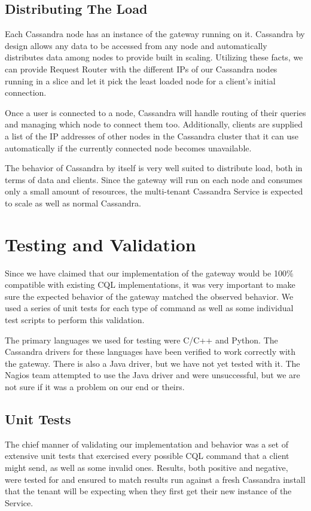 \documentclass[11pt,notitlepage]{report}
\begin{document}
\section*{Distributing The Load}

Each Cassandra node has an instance of the gateway running on it. Cassandra by design allows any data to be accessed from any node and automatically distributes data among nodes to provide built in scaling. Utilizing these facts, we can provide Request Router with the different IPs of our Cassandra nodes running in a slice and let it pick the least loaded node for a client’s initial connection.

Once a user is connected to a node, Cassandra will handle routing of their queries and managing which node to connect them too. Additionally, clients are supplied a list of the IP addresses of other nodes in the Cassandra cluster that it can use automatically if the currently connected node becomes unavailable.

The behavior of Cassandra by itself is very well suited to distribute load, both in terms of data and clients. Since the gateway will run on each node and consumes only a small amount of resources, the multi-tenant Cassandra Service is expected to scale as well as normal Cassandra.


\chapter*{Testing and Validation}

Since we have claimed that our implementation of the gateway would be 100$\%$ compatible with existing CQL implementations, it was very important to make sure the expected behavior of the gateway matched the observed behavior. We used a series of unit tests for each type of command as well as some individual test scripts to perform this validation.

The primary languages we used for testing were C/C++ and Python. The Cassandra drivers for these languages have been verified to work correctly with the gateway. There is also a Java driver, but we have not yet tested with it. The Nagios team attempted to use the Java driver and were unsuccessful, but we are not sure if it was a problem on our end or theirs.


\section*{Unit Tests}
The chief manner of validating our implementation and behavior was a set of extensive unit tests that exercised every possible CQL command that a client might send, as well as some invalid ones. Results, both positive and negative, were tested for and ensured to match results run against a fresh Cassandra install that the tenant will be expecting when they first get their new instance of the Service.
\end{document}
